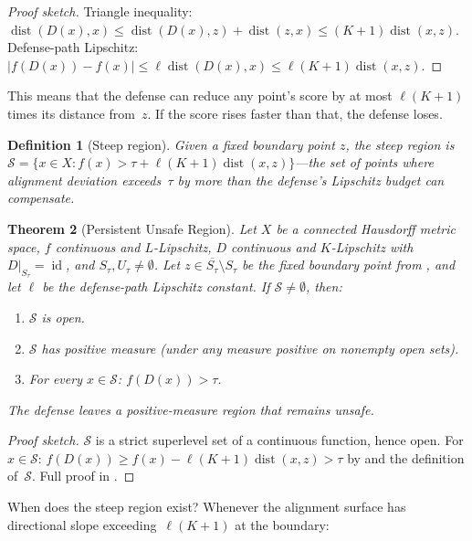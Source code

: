 \documentclass[11pt]{article}
\newtheorem{theorem}{Theorem}[section]
\newtheorem{definition}[theorem]{Definition}
\newcommand{\cl}[1]{\overline{#1}}
\newcommand{\id}{\operatorname{id}}
\newcommand{\dist}{\operatorname{dist}}
\begin{document}
\begin{proof}[Proof sketch]
Triangle inequality:
$\dist(D(x), x) \leq \dist(D(x), z) + \dist(z, x)
\leq (K+1)\dist(x, z)$.
Defense-path Lipschitz: $|f(D(x)) - f(x)| \leq \ell\dist(D(x), x)
\leq \ell(K+1)\dist(x, z)$.
\end{proof}

This means that the defense can reduce any point's score by at most
$\ell(K+1)$ times its distance from~$z$. If the score rises faster
than that, the defense loses.

\begin{definition}[Steep region]
\label{def:steep}
Given a fixed boundary point $z$, the \emph{steep region} is
$\mathcal{S} = \{x \in X : f(x) > \tau + \ell(K+1)\dist(x, z)\}$---the
set of points where alignment deviation exceeds~$\tau$ by more than
the defense's Lipschitz budget can compensate.
\end{definition}

\begin{theorem}[Persistent Unsafe Region]
\label{thm:persistent}
Let $X$ be a connected Hausdorff metric space, $f$ continuous and
$L$-Lipschitz, $D$ continuous and $K$-Lipschitz with
$D|_{S_\tau} = \id$, and $S_\tau, U_\tau \neq \emptyset$.
Let $z \in \cl{S_\tau} \setminus S_\tau$ be the fixed boundary
point from , and let $\ell$ be the defense-path
Lipschitz constant. If $\mathcal{S} \neq \emptyset$, then:
\begin{enumerate}[nosep]
  \item $\mathcal{S}$ is open.
  \item $\mathcal{S}$ has positive measure (under any measure positive
    on nonempty open sets).
  \item For every $x \in \mathcal{S}$: $f(D(x)) > \tau$.
\end{enumerate}
The defense leaves a positive-measure region that remains unsafe.
\end{theorem}

\begin{proof}[Proof sketch]
$\mathcal{S}$ is a strict superlevel set of a continuous function,
hence open. For $x \in \mathcal{S}$:
$f(D(x)) \geq f(x) - \ell(K+1)\dist(x,z) > \tau$
by  and the definition of~$\mathcal{S}$.
Full proof in .
\end{proof}

When does the steep region exist? Whenever the alignment surface has
directional slope exceeding~$\ell(K+1)$ at the boundary:
\end{document}
